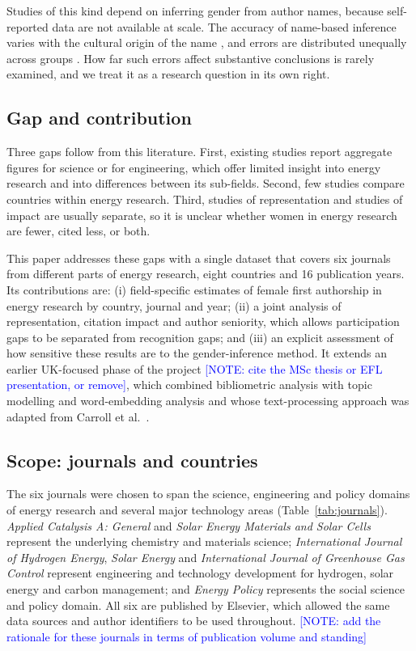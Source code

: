 \documentclass[preprint,12pt,number]{elsarticle}
\newcommand{\note}[1]{\textcolor{blue}{[NOTE: #1]}}
\begin{document}
Studies of this kind depend on inferring gender from author names, because self-reported data are not available at scale. The accuracy of name-based inference varies with the cultural origin of the name \citep{Santamaria2018}, and errors are distributed unequally across groups \citep{Lockhart2023}. How far such errors affect substantive conclusions is rarely examined, and we treat it as a research question in its own right.

\subsection{Gap and contribution}

Three gaps follow from this literature. First, existing studies report aggregate figures for science or for engineering, which offer limited insight into energy research and into differences between its sub-fields. Second, few studies compare countries within energy research. Third, studies of representation and studies of impact are usually separate, so it is unclear whether women in energy research are fewer, cited less, or both.

This paper addresses these gaps with a single dataset that covers six journals from different parts of energy research, eight countries and 16 publication years. Its contributions are: (i) field-specific estimates of female first authorship in energy research by country, journal and year; (ii) a joint analysis of representation, citation impact and author seniority, which allows participation gaps to be separated from recognition gaps; and (iii) an explicit assessment of how sensitive these results are to the gender-inference method. It extends an earlier UK-focused phase of the project \note{cite the MSc thesis or EFL presentation, or remove}, which combined bibliometric analysis with topic modelling and word-embedding analysis and whose text-processing approach was adapted from Carroll et al.\ \citep{Carroll2023}.

\subsection{Scope: journals and countries}

The six journals were chosen to span the science, engineering and policy domains of energy research and several major technology areas (Table~\ref{tab:journals}). \textit{Applied Catalysis A: General} and \textit{Solar Energy Materials and Solar Cells} represent the underlying chemistry and materials science; \textit{International Journal of Hydrogen Energy}, \textit{Solar Energy} and \textit{International Journal of Greenhouse Gas Control} represent engineering and technology development for hydrogen, solar energy and carbon management; and \textit{Energy Policy} represents the social science and policy domain. All six are published by Elsevier, which allowed the same data sources and author identifiers to be used throughout. \note{add the rationale for these journals in terms of publication volume and standing}
\end{document}
